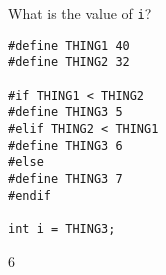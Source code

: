 What is the value of \texttt{i}?
\begin{verbatim}
#define THING1 40
#define THING2 32

#if THING1 < THING2
#define THING3 5
#elif THING2 < THING1
#define THING3 6
#else
#define THING3 7
#endif

int i = THING3;
\end{verbatim}
\begin{answer}
6
\end{answer}